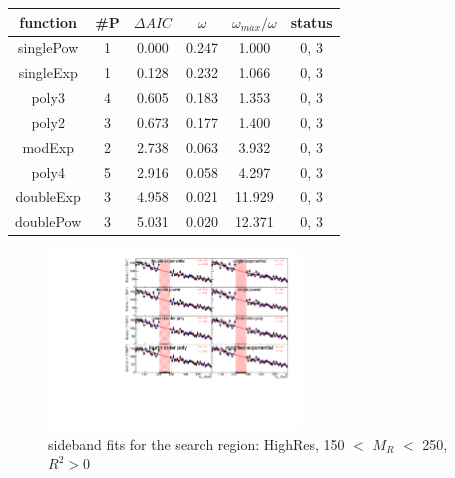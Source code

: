 \begin{table}[h] 
\begin{center} 
\begin{tabular}{|c|c|ccc|c|} 
\hline function & \#P & $\Delta AIC$ & $\omega$ & $\omega_{max}/\omega$ & status \\ \hline 
\rowcolor[rgb]{0.31,0.78,0.47}  
singlePow &  1 &  0.000 &  0.247 &  1.000 &  0,  3 \\ 
\rowcolor[rgb]{0.31,0.78,0.47}  
singleExp &  1 &  0.128 &  0.232 &  1.066 &  0,  3 \\ 
\rowcolor[rgb]{0.31,0.78,0.47}  
poly3 &  4 &  0.605 &  0.183 &  1.353 &  0,  3 \\ 
\rowcolor[rgb]{0.31,0.78,0.47}  
poly2 &  3 &  0.673 &  0.177 &  1.400 &  0,  3 \\ 
\rowcolor[rgb]{1.0,0.41,0.38}  
modExp &  2 &  2.738 &  0.063 &  3.932 &  0,  3 \\ 
\rowcolor[rgb]{1.0,0.41,0.38}  
poly4 &  5 &  2.916 &  0.058 &  4.297 &  0,  3 \\ 
\rowcolor[rgb]{1.0,0.41,0.38}  
doubleExp &  3 &  4.958 &  0.021 & 11.929 &  0,  3 \\ 
\rowcolor[rgb]{1.0,0.41,0.38}  
doublePow &  3 &  5.031 &  0.020 & 12.371 &  0,  3 \\ 
\hline 
\end{tabular} 
\label{tab:AICresults1} 
\end{center} 
\end{table} 

\begin{figure}[h] 
\begin{center} 
\includegraphics[width=0.6\textwidth]{hgg/highres/150_0d000.pdf} 
\caption{sideband fits for the search region: HighRes, 150 $<$ $M_R$
  $<$ 250\GeV, $R^2 > 0$} 
\label{fig:AICresults2} 
\end{center} 
\end{figure}

